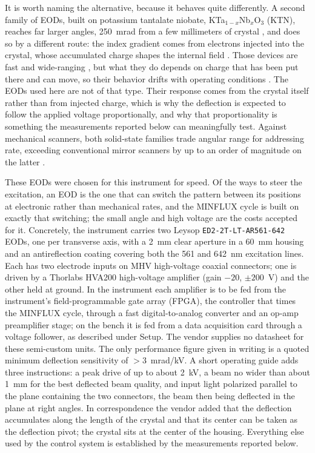 \documentclass{article}
\begin{document}
It is worth naming the alternative, because it behaves quite differently. A second family of
EODs, built on potassium tantalate niobate, KTa$_{1-x}$Nb$_x$O$_3$ (KTN), reaches far
larger angles, 250~mrad from a few millimeters of crystal
\cite{nakamuraSpacechargecontrolledElectroopticEffect2008}, and does so by a different route: the
index gradient comes from electrons injected into the crystal, whose accumulated charge shapes
the internal field \cite{nakamuraSpacechargecontrolledElectroopticEffect2008,bechtoldBeamProfileDeformation2012}.
Those devices are fast and wide-ranging
\cite{bechtoldBeamProfileDeformation2012,miyazu400KHzBeam2010,yagiElectroopticKTNDevices2014},
but what they do depends on charge that has been put there and can move, so their behavior
drifts with operating conditions \cite{bechtoldBeamProfileDeformation2012}. The EODs used
here are not of that type. Their response comes from the crystal itself rather than from injected
charge, which is why the deflection is expected to follow the applied voltage proportionally, and
why that proportionality is something the measurements reported below can meaningfully test.
Against mechanical scanners, both solid-state families trade angular range for addressing rate,
exceeding conventional mirror scanners by up to an order of magnitude on the latter
\cite{romerElectroopticAcoustoopticLaser2014,heberleElectroopticAcoustoopticLaser2016}.

These EODs were chosen for this instrument for speed. Of the ways to steer the excitation,
an EOD is the one that can switch the pattern between its positions at
electronic rather than mechanical rates, and the MINFLUX cycle is built on exactly that switching;
the small angle and high voltage are the costs accepted for it. Concretely, the instrument carries
two Leysop \texttt{ED2-2T-LT-AR561-642} EODs, one per transverse axis, with a 2~mm clear
aperture in a 60~mm housing and an antireflection coating covering both the 561 and 642~nm
excitation lines. Each has two electrode inputs on MHV high-voltage coaxial connectors; one is
driven by a Thorlabs HVA200 high-voltage amplifier (gain $-20$, $\pm200$~V) and the other held at
ground. In the instrument each amplifier is to be fed from the instrument's field-programmable gate
array (FPGA), the controller that times the MINFLUX cycle, through a fast digital-to-analog converter and an op-amp preamplifier stage; on the bench
it is fed from a data acquisition card through a voltage follower, as described under Setup.
The vendor supplies no datasheet for these semi-custom units. The only performance figure given
in writing is a quoted minimum deflection sensitivity of ${>}3$~mrad/kV. A short operating guide
adds three instructions: a peak drive of up to about 2~kV, a beam no wider than about 1~mm for the
best deflected beam quality, and input light polarized parallel to the plane containing the two
connectors, the beam then being deflected in the plane at right angles. In correspondence the
vendor added that the deflection accumulates along the length of the crystal and that its center
can be taken as the deflection pivot; the crystal sits at the center of the housing. Everything
else used by the control system is established by the measurements reported below.
\end{document}
